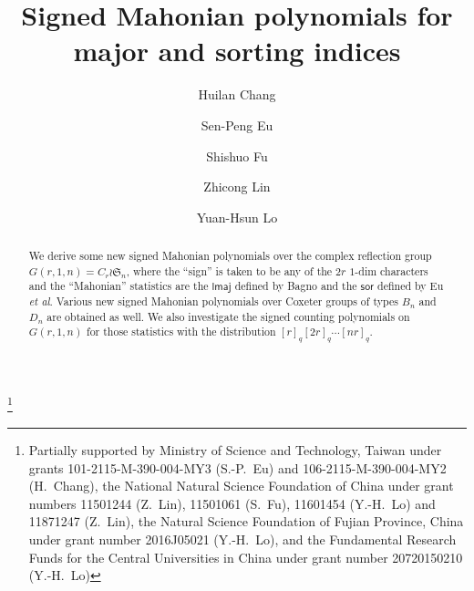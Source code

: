 \documentclass[a4paper, reqno, 11pt]{amsart}
\newcommand{\lmaj}{{\textsf{lmaj}}}
\newcommand{\sor}{{\textsf{sor}}}
\numberwithin{equation}{section}
\begin{document}
\title[Signed Mahonian on $G(r,1,n)$]{Signed Mahonian polynomials for major and sorting indices}

\author{Huilan Chang}
\address{Department of Applied Mathematics \\
National University of Kaohsiung \\
Taiwan, ROC} 

\author{Sen-Peng Eu}
\address{Department of Mathematics \\
National Taiwan Normal University \\
Taiwan, ROC} 

\author{Shishuo Fu}
\address{College of Mathematics and Statistics \\
Chongqing University \\
Chongqing, P.~R.~China}

\author{Zhicong Lin}
\address{School of Science \\
Jimei University \\
Xiamen, P.~R.~China}

\author{Yuan-Hsun Lo}
\address{School of Mathematical Sciences \\
Xiamen University \\
Xiamen, P.~R.~China}




\thanks{Partially supported by Ministry of Science and Technology, Taiwan under grants 101-2115-M-390-004-MY3 (S.-P.~Eu) and 106-2115-M-390-004-MY2 (H.~Chang), the National Natural Science Foundation of China under grant numbers 11501244 (Z.~Lin), 11501061 (S.~Fu), 11601454 (Y.-H.~Lo) and 11871247 (Z.~Lin), the Natural Science Foundation of Fujian Province, China under grant number 2016J05021 (Y.-H.~Lo), and the Fundamental Research Funds for the Central Universities in China under grant number 20720150210 (Y.-H.~Lo)}

\maketitle


\begin{abstract}

We derive some new signed Mahonian polynomials over the complex reflection group $G(r,1,n)=C_r\wr\mathfrak{S}_n$, where the ``sign'' is taken to be any of the $2r$ $1$-dim characters and the ``Mahonian'' statistics are the $\lmaj$ defined by Bagno and the $\sor$ defined by Eu \emph{et al}. 
Various new signed Mahonian polynomials over Coxeter groups of types $B_n$ and $D_n$ are obtained as well.
We also investigate the signed counting polynomials on $G(r,1,n)$ for those statistics with the distribution $[r]_q[2r]_q\cdots [nr]_q$.
\end{abstract}
\end{document}
